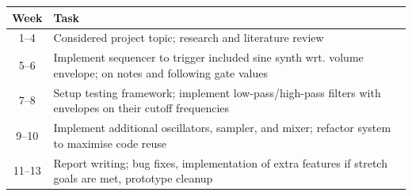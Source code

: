 \begin{table}[!hbt]
	\centering
	\renewcommand{\arraystretch}{1.2}
	\begin{tabular}{c p{}}
		\toprule
		\textbf{Week} & \textbf{Task} \\
		\midrule
		1--4 & Considered project topic; research and literature review \\
		5--6 & Implement sequencer to trigger included sine synth wrt. volume envelope; on notes and following gate values\\
		7--8 & Setup testing framework; implement low-pass/high-pass filters with envelopes on their cutoff frequencies \\
		9--10 & Implement additional oscillators, sampler, and mixer; refactor system to maximise code reuse\\
		11--13 & Report writing; bug fixes, implementation of extra features if stretch goals are met, prototype cleanup \\
		\bottomrule
	\end{tabular}
\end{table}
